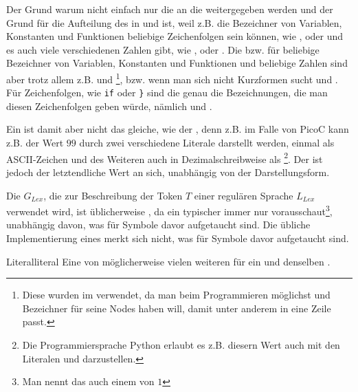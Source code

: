 Der Grund warum nicht einfach nur die  an die  weitergegeben werden und der Grund für die Aufteilung des  in  und  ist, weil z.B. die Bezeichner von Variablen, Konstanten und Funktionen beliebige Zeichenfolgen sein können, wie ,  oder  und es auch viele verschiedenen Zahlen gibt, wie ,  oder . Die  bzw.  für beliebige Bezeichner von Variablen, Konstanten und Funktionen und beliebige Zahlen sind aber trotz allem z.B.  und \footnote{Diese  wurden im   verwendet, da man beim Programmieren möglichst  und  Bezeichner für seine Nodes haben will, damit unter anderem  in eine Zeile passt.}, bzw. wenn man sich nicht Kurzformen sucht  und . Für Zeichenfolgen, wie \verb|if| oder \verb|}| sind die  genau die Bezeichnungen, die man diesen Zeichenfolgen geben würde, nämlich  und .

Ein  ist damit aber nicht das gleiche, wie der , denn z.B. im Falle von PicoC kann z.B. der Wert $99$ durch zwei verschiedene Literale darstellt werden, einmal als ASCII-Zeichen  und des Weiteren auch in Dezimalschreibweise als \footnote{Die Programmiersprache Python erlaubt es z.B. diesern Wert auch mit den Literalen  und  darzustellen.}. Der  ist jedoch der letztendliche Wert an sich, unabhängig von der Darstellungsform.

  Die  $G_{Lex}$, die zur Beschreibung der Token $T$ einer regulären Sprache $L_{Lex}$ verwendet wird, ist üblicherweise , da ein typischer  immer nur  vorausschaut\footnote{Man nennt das auch einem  von $1$}, unabhängig davon, was für Symbole davor aufgetaucht sind. Die übliche Implementierung eines  merkt sich nicht, was für Symbole davor aufgetaucht sind.


\begin{Definition}{Literal}{literal}
  Eine von möglicherweise vielen weiteren  für ein und denselben .
\end{Definition}

